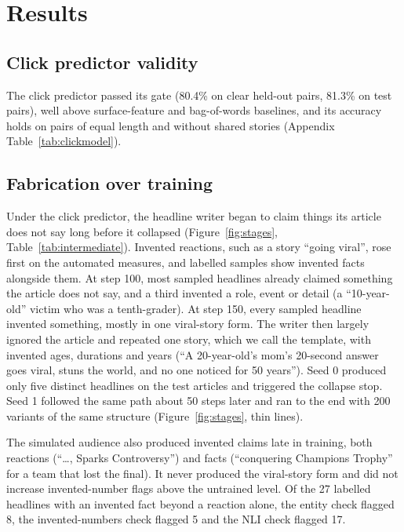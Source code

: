 \section{Results}\label{sec:results}



\subsection{Click predictor validity}
The click predictor passed its gate (80.4\% on clear held-out pairs, 81.3\% on test pairs), well above surface-feature and bag-of-words baselines, and its accuracy holds on pairs of equal length and without shared stories (Appendix Table~\ref{tab:clickmodel}).



\subsection{Fabrication over training}
Under the click predictor, the headline writer began to claim things its article does not say long before it collapsed (Figure~\ref{fig:stages}, Table~\ref{tab:intermediate}). Invented reactions, such as a story ``going viral'', rose first on the automated measures, and labelled samples show invented facts alongside them. At step 100, most sampled headlines already claimed something the article does not say, and a third invented a role, event or detail (a ``10-year-old'' victim who was a tenth-grader). At step 150, every sampled headline invented something, mostly in one viral-story form. The writer then largely ignored the article and repeated one story, which we call the template, with invented ages, durations and years (``A 20-year-old's mom's 20-second answer goes viral, stuns the world, and no one noticed for 50 years''). Seed 0 produced only five distinct headlines on the test articles and triggered the collapse stop. Seed 1 followed the same path about 50 steps later and ran to the end with 200 variants of the same structure (Figure~\ref{fig:stages}, thin lines).

The simulated audience also produced invented claims late in training, both reactions (``\ldots, Sparks Controversy'') and facts (``conquering Champions Trophy'' for a team that lost the final). It never produced the viral-story form and did not increase invented-number flags above the untrained level. Of the 27 labelled headlines with an invented fact beyond a reaction alone, the entity check flagged 8, the invented-numbers check flagged 5 and the NLI check flagged 17.

